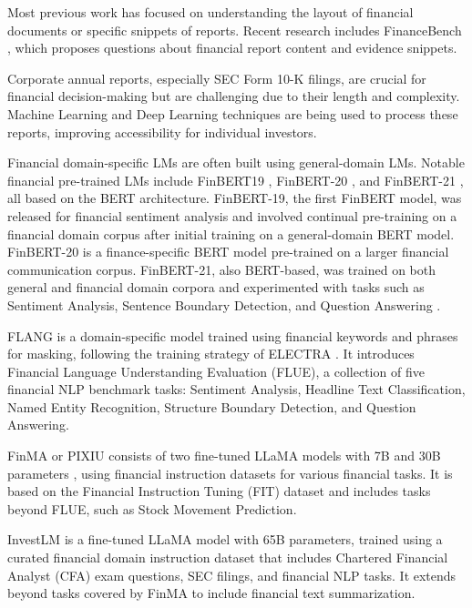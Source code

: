 Most previous work has focused on understanding the layout of financial documents or specific snippets of reports. Recent research includes FinanceBench \cite{Islam.20Nov2023}, which proposes questions about financial report content and evidence snippets.

Corporate annual reports, especially SEC Form 10-K filings, are crucial for financial decision-making but are challenging due to their length and complexity. Machine Learning and Deep Learning techniques are being used to process these reports, improving accessibility for individual investors.

Financial domain-specific LMs are often built using general-domain LMs. Notable financial pre-trained LMs include FinBERT19 \cite{Araci.27Aug2019}, FinBERT-20 \cite{Shah.31Oct2022}, and FinBERT-21 \cite{ZhuangLiuDegenHuangKaiyuHuangZhuangLiJunZhao.2020}, all based on the BERT architecture. FinBERT-19, the first FinBERT model, was released for financial sentiment analysis and involved continual pre-training on a financial domain corpus after initial training on a general-domain BERT model. FinBERT-20 is a finance-specific BERT model pre-trained on a larger financial communication corpus. FinBERT-21, also BERT-based, was trained on both general and financial domain corpora and experimented with tasks such as Sentiment Analysis, Sentence Boundary Detection, and Question Answering \cite{Lee.4Feb2024}.

FLANG \cite{Shah.31Oct2022} is a domain-specific model trained using financial keywords and phrases for masking, following the training strategy of ELECTRA \cite{Clark.23Mar2020}. It introduces Financial Language Understanding Evaluation (FLUE), a collection of five financial NLP benchmark tasks: Sentiment Analysis, Headline Text Classification, Named Entity Recognition, Structure Boundary Detection, and Question Answering.

FinMA or PIXIU \cite{Xie.8Jun2023} consists of two fine-tuned LLaMA models with 7B and 30B parameters \cite{Touvron.27Feb2023}, using financial instruction datasets for various financial tasks. It is based on the Financial Instruction Tuning (FIT) dataset and includes tasks beyond FLUE, such as Stock Movement Prediction.

InvestLM \cite{Yang.15Sep2023} is a fine-tuned LLaMA model with 65B parameters, trained using a curated financial domain instruction dataset that includes Chartered Financial Analyst (CFA) exam questions, SEC filings, and financial NLP tasks. It extends beyond tasks covered by FinMA to include financial text summarization.

